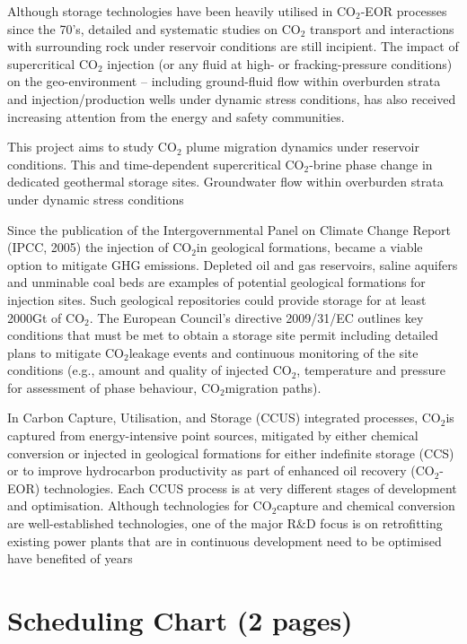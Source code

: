 \documentclass[12pts,a4paper,amsmath,amssymb,floatfix]{article}%
\newcommand{\CO}{CO\ensuremath{_{2}}}
\begin{document}
Although storage technologies have been heavily utilised in \CO-EOR processes since the 70's, detailed and systematic studies on \CO\; transport and interactions with surrounding rock under reservoir conditions are still incipient. The impact of supercritical \CO\; injection (or any fluid at high- or fracking-pressure conditions) on the geo-environment -- including ground-fluid flow within overburden strata and injection/production wells under dynamic stress conditions, has also received increasing attention from the energy and safety communities.


This project aims to study \CO\; plume migration dynamics under reservoir conditions. This and time-dependent supercritical \CO-brine phase change in dedicated geothermal storage sites.
Groundwater flow within overburden strata under dynamic stress conditions



Since the publication of the Intergovernmental Panel on Climate Change Report (IPCC, 2005) the injection of \CO in geological formations, became a viable option to mitigate GHG emissions. Depleted oil and gas reservoirs, saline aquifers and unminable coal beds are examples of potential geological formations for injection sites. Such geological repositories could provide storage for at least 2000Gt of \CO. The European Council's directive 2009/31/EC outlines key conditions that must be met to obtain a storage site permit including detailed plans to mitigate \CO leakage events and continuous monitoring of the site conditions (e.g., amount and quality of injected \CO, temperature and pressure for assessment of phase behaviour, \CO migration paths).


In Carbon Capture, Utilisation, and Storage (CCUS) integrated processes, \CO is captured from energy-intensive point sources, mitigated by either chemical conversion or injected in geological formations for either indefinite storage (CCS) or to improve hydrocarbon productivity as part of enhanced oil recovery (\CO-EOR) technologies. Each CCUS process is at very different stages of development and optimisation. Although technologies for \CO capture and chemical conversion are well-established technologies, one of the major R$\&$D focus is on retrofitting existing power plants that are in continuous development need to be optimised have benefited of years

\section{Scheduling Chart (2 pages)}
\end{document}
